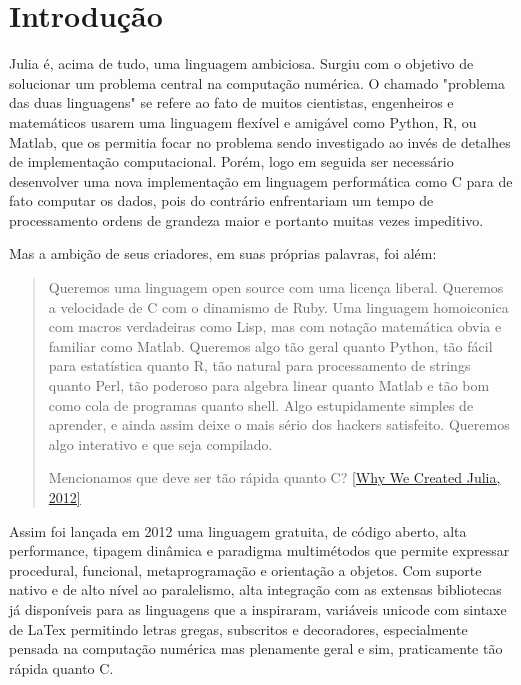 % 



\chapter{ Introdu\c{c}\~{a}o}

Julia é, acima de tudo, uma linguagem ambiciosa. 
Surgiu com o objetivo de solucionar um problema central na computação numérica. O chamado "problema das duas linguagens" se refere ao fato de muitos cientistas, engenheiros e matemáticos usarem uma linguagem flexível e amigável como Python, R, ou Matlab, que os permitia focar no problema sendo investigado ao invés de detalhes de implementação computacional. Porém, logo em seguida ser necessário desenvolver uma nova implementação em linguagem performática como C para de fato computar os dados, pois do contrário enfrentariam um tempo de processamento ordens de grandeza maior e portanto muitas vezes impeditivo. \cite{Lauwens2019}

Mas a ambição de seus criadores, em suas próprias palavras, foi além:

\begin{quote}
   Queremos uma linguagem open source com uma licença liberal. Queremos a velocidade de C com o dinamismo de Ruby. Uma linguagem homoiconica com macros verdadeiras como Lisp, mas com notação matemática obvia e familiar como Matlab. Queremos algo tão geral quanto Python, tão fácil para estatística quanto R, tão natural para processamento de strings quanto Perl, tão poderoso para algebra linear quanto Matlab e tão bom como cola de programas quanto shell. Algo estupidamente simples de aprender, e ainda assim deixe o mais sério dos hackers satisfeito. Queremos algo interativo e que seja compilado. 
   
   Mencionamos que deve ser tão rápida quanto C? 
   \href{https://julialang.org/blog/2012/02/why-we-created-julia/}{[Why We Created Julia, 2012]}
   
   
\end{quote}

Assim foi lançada em 2012 uma linguagem gratuita, de código aberto, alta performance, tipagem dinâmica e paradigma multimétodos que permite expressar procedural, funcional, metaprogramação e orientação a objetos. Com suporte nativo e de alto nível ao paralelismo, alta integração com as extensas bibliotecas já disponíveis para as linguagens que a inspiraram, variáveis unicode com sintaxe de LaTex permitindo letras gregas, subscritos e decoradores, especialmente pensada na computação numérica mas plenamente geral e sim, praticamente tão rápida quanto C. \cite{Lobianco2019,Bezanson2017}

